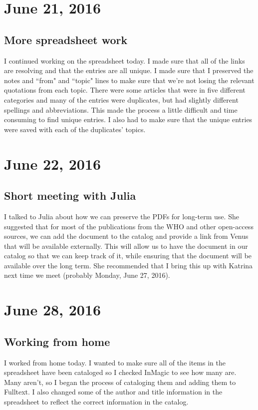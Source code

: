 \documentclass{article}
\begin{document}
\section{June 21, 2016}
\subsection{More spreadsheet work}
I continued working on the spreadsheet today. I made sure that all of the links are resolving and that the entries are all unique. I made sure that I preserved the notes and ``from" and ``topic" lines to make sure that we're not losing the relevant quotations from each topic. There were some articles that were in five different categories and many of the entries were duplicates, but had slightly different spellings and abbreviations. This made the process a little difficult and time consuming to find unique entries. I also had to make sure that the unique entries were saved with each of the duplicates' topics. 

\section{June 22, 2016}
\subsection{Short meeting with Julia}
I talked to Julia about how we can preserve the PDFs for long-term use. She suggested that for most of the publications from the WHO and other open-access sources, we can add the document to the catalog and provide a link from Venus that will be available externally. This will allow us to have the document in our catalog so that we can keep track of it, while ensuring that the document will be available over the long term. She recommended that I bring this up with Katrina next time we meet (probably Monday, June 27, 2016).

\section{June 28, 2016}
\subsection{Working from home}
I worked from home today. I wanted to make sure all of the items in the spreadsheet have been cataloged so I checked InMagic to see how many are. Many aren't, so I began the process of cataloging them and adding them to Fulltext. I also changed some of the author and title information in the spreadsheet to reflect the correct information in the catalog.
\end{document}
